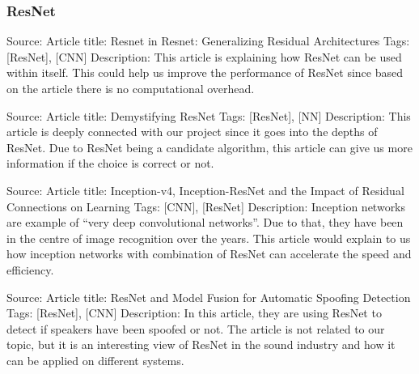 \subsubsection{ResNet}
Source: \parencite{targ2016resnet}
\newline
Article title: Resnet in Resnet: Generalizing Residual Architectures
\newline
Tags: [ResNet], [CNN]
\newline
Description:
\newline
This article is explaining how ResNet can be used within itself. This could help us improve the performance of ResNet since based on the article there is no computational overhead.
\newline

Source: \parencite{li2016demystifying}
\newline
Article title: Demystifying ResNet 
\newline
Tags: [ResNet], [NN] Description:
\newline
This article is deeply connected with our project since it goes into the depths of ResNet. Due to ResNet being a candidate algorithm, this article can give us more information if the choice is correct or not.
\newline

Source:\parencite{szegedy2017inception}
\newline
Article title: Inception-v4, Inception-ResNet and the Impact of Residual Connections on Learning
\newline
Tags: [CNN], [ResNet]
\newline
Description:
\newline
Inception networks are example of “very deep convolutional networks”. Due to that, they have been in the centre of image recognition over the years. This article would explain to us how inception networks with combination of ResNet can accelerate the speed and efficiency.
\newline

Source: \parencite{chen2017resnet}
\newline
Article title: ResNet and Model Fusion for Automatic Spoofing Detection 
\newline
Tags: [ResNet], [CNN]
\newline
Description:
\newline
In this article, they are using ResNet to detect if speakers have been spoofed or not. The article is not related to our topic, but it is an interesting view of ResNet in the sound industry and how it can be applied on different systems.
\newline

